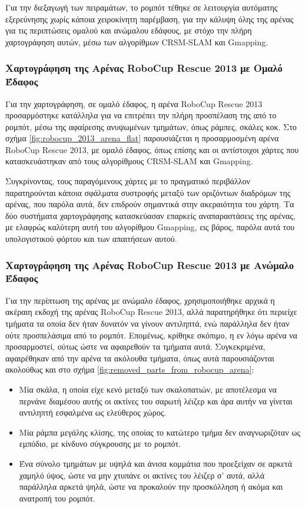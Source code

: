 \bigskip
Για την διεξαγωγή των πειραμάτων, το ρομπότ τέθηκε σε λειτουργία αυτόματης εξερεύνησης χωρίς κάποια χειροκίνητη παρέμβαση, για την κάλυψη όλης της αρένας για τις περιπτώσεις ομαλού και ανώμαλου εδάφους, με στόχο την πλήρη χαρτογράφηση αυτών, μέσω των αλγορίθμων CRSM-SLAM και Gmapping.

\subsubsection{Χαρτογράφηση της Αρένας RoboCup Rescue 2013 με Ομαλό Έδαφος}
Για την χαρτογράφηση, σε ομαλό έδαφος, η αρένα RoboCup Rescue 2013 προσαρμόστηκε κατάλληλα για να επιτρέπει την πλήρη προσπέλαση της από το ρομπότ, μέσω της αφαίρεσης ανυψωμένων τμημάτων, όπως ράμπες, σκάλες κοκ. Στο σχήμα \ref{fig:robocup_2013_arena_flat} παρουσιάζεται η προσαρμοσμένη αρένα RoboCup Rescue 2013, με ομαλό έδαφος, όπως επίσης και οι αντίστοιχοι χάρτες που κατασκευάστηκαν από τους αλγορίθμους CRSM-SLAM και Gmapping.

\bigskip
Συγκρίνοντας, τους παραγόμενους χάρτες με το πραγματικό περιβάλλον παρατηρούνται κάποια σφάλματα συστροφής μεταξύ των οριζόντιων διαδρόμων της αρένας, που παρόλα αυτά, δεν επιδρούν σημαντικά στην ακεραιότητα του χάρτη. Τα δύο συστήματα χαρτογράφησης κατασκεύασαν επαρκείς αναπαραστάσεις της αρένας, με ελαφρώς καλύτερη αυτή του αλγορίθμου Gmapping, εις βάρος, παρόλα αυτά του υπολογιστικού φόρτου και των απαιτήσεων αυτού. 

\subsubsection{Χαρτογράφηση της Αρένας RoboCup Rescue 2013 με Ανώμαλο Έδαφος}
Για την περίπτωση της αρένας με ανώμαλο έδαφος, χρησιμοποιήθηκε αρχικά η ακέραιη εκδοχή της αρένας RoboCup Rescue 2013, αλλά παρατηρήθηκε ότι περιείχε τμήματα τα οποία δεν ήταν δυνατόν να γίνουν αντιληπτά, ενώ παράλληλα δεν ήταν ούτε προσπελάσιμα από το ρομπότ. Επομένως, κρίθηκε σκόπιμο, η εν λόγω αρένα να προσαρμοστεί, ούτως ώστε να αφαιρεθούν τα τμήματα αυτά. Συγκεκριμένα, αφαιρέθηκαν από την αρένα τα ακόλουθα τμήματα, όπως αυτά παρουσιάζονται ακολούθως και στο σχήμα \ref{fig:removed_parts_from_robocup_arena}:

\begin{itemize}
	\item Μία σκάλα, η οποία είχε κενό μεταξύ των σκαλοπατιών, με αποτέλεσμα να περνάνε διαμέσου αυτής οι ακτίνες του σαρωτή λέιζερ και άρα αυτήν να γίνεται αντιληπτή εσφαλμένα ως ελεύθερος χώρος.
	\item Μία ράμπα μεγάλης κλίσης, της οποίας το κατώτερο τμήμα δεν αναγνωριζόταν ως εμπόδιο, με κίνδυνο σύγκρουσης με το ρομπότ.
	\item Ένα σύνολο τμημάτων με υψηλά και άνισα κομμάτια που προεξείχαν σε αρκετά χαμηλό ύψος, ώστε να μην χτυπάνε οι ακτίνες του λέιζερ σ' αυτά, αλλά παράλληλα αρκετά ψηλά, ώστε να προκαλούν την προσκόλληση ή ακόμα και ανατροπή του ρομπότ.
\end{itemize}

